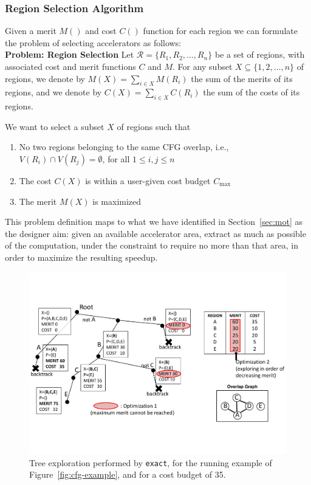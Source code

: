 \documentclass[]{usiinfthesis}
\newcommand{\exact}{\texttt{exact}}
\begin{document}
\subsubsection{Region Selection Algorithm}
\label{subsec:sel_algo}

Given a merit $M()$ and cost $C()$ function for each region 
we can formulate the problem of selecting accelerators as follows:\\
\textbf{Problem: Region Selection}
Let $\mathcal{R} = \{ R_1, R_2, \ldots, R_n \}$ be a set of regions,
with associated cost and merit functions $C$ and $M$.
For any subset $X\subseteq \{1,2,\ldots,n\}$ of regions,
we denote by $M(X) = \sum_{i\in X} M(R_i)$ the sum of the merits of
its regions, and we denote by $C(X) = \sum_{i\in X} C(R_i)$ the sum of
the costs of its regions.

We want to select a subset $X$ of regions such that
\begin{enumerate}
\item No two regions belonging to the same CFG overlap, i.e.,
  $V(R_i)\cap V(R_j) = \emptyset$, for all $1\le i,j\le n$
\item The cost $C(X)$ is within a user-given cost budget $C_{\max}$
\item The merit $M(X)$ is maximized
\end{enumerate}


This problem definition maps to what we have identified in
Section~\ref{sec:mot} as the designer aim: given an available
accelerator area, extract as much as possible of the computation,
under the constraint to require no more than that area, in order to
maximize the resulting speedup.\par

\begin{figure}[t]
\centering
\includegraphics[width= .9 \linewidth]{Figs/exact_tree.pdf}
\caption{Tree exploration performed by \exact, for the running example
  of Figure~\ref{fig:cfg-example}, and for a cost budget of 35.}
\label{fig:exact_tree}
\end{figure}
\end{document}
